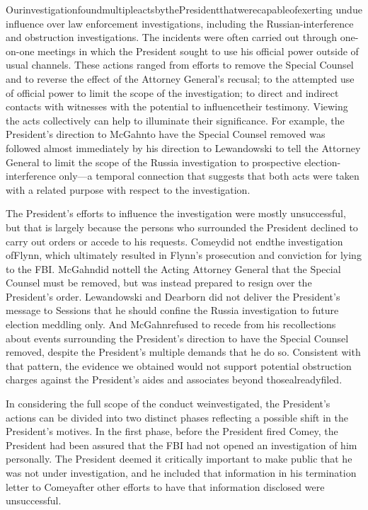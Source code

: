 {OurinvestigationfoundmultipleactsbythePresidentthatwerecapableofexerting undue influence over law enforcement investigations, including the Russian-interference and obstruction investigations. The incidents were often carried out through one-on-one meetings in which the President sought to use his official power outside of usual channels. These actions ranged from efforts to remove the Special Counsel and to reverse the effect of the Attorney General’s recusal; to the attempted use of official power to limit the scope of the investigation; to direct and indirect contacts with witnesses with the potential to influencetheir testimony. Viewing
the acts collectively can help to illuminate their significance. For example, the President’s direction to McGahnto have the Special Counsel removed was followed almost immediately by his direction to Lewandowski to tell the Attorney General to limit the scope of the Russia investigation to prospective election-interference only—a temporal connection that suggests that both acts were taken with a related purpose with respect to the investigation.

The President’s efforts to influence the investigation were mostly unsuccessful, but that is largely because the persons who surrounded the President declined to carry out orders or accede to his requests. Comeydid not endthe investigation ofFlynn, which ultimately resulted in Flynn’s prosecution and conviction for lying to the FBI. McGahndid nottell the Acting Attorney General that the Special Counsel must be removed, but was instead prepared to resign over the President’s order. Lewandowski and Dearborn did not deliver the President’s message to Sessions that he should confine the Russia investigation to future election meddling only. And McGahnrefused to recede from his recollections about events surrounding the President’s direction to have the Special Counsel removed, despite the President’s multiple demands that he do so. Consistent with that pattern, the evidence we obtained would not support potential obstruction charges against the President’s aides and associates beyond thosealreadyfiled.

In considering the full scope of the conduct weinvestigated, the President’s actions can be divided into two distinct phases reflecting a possible shift in the President’s motives. In the first phase, before the President fired Comey, the President had been assured that the FBI had not opened an investigation of him personally. The President deemed it critically important to make public that he was not under investigation, and he included that information in his termination letter to Comeyafter other efforts to have that information disclosed were unsuccessful.

}
